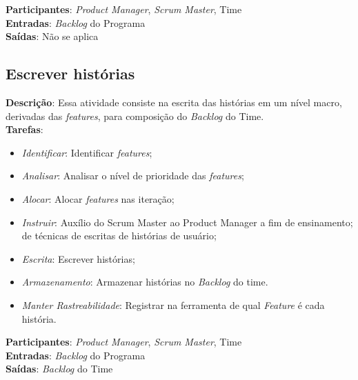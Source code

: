   \textbf{Participantes}: \textit{Product Manager}, \textit{Scrum Master}, Time\\

  \textbf{Entradas}: \textit{Backlog} do Programa \\

  \textbf{Saídas}:  Não se aplica\\

\subsection{Escrever histórias}
  \textbf{Descrição}: Essa atividade consiste na escrita das histórias em um nível macro, derivadas das \textit{features}, para composição do \textit{Backlog} do Time. \\

  \textbf{Tarefas}:
  \begin{itemize}
   \item \indent \textit{Identificar}: Identificar \textit{features};

   \item \indent \textit{Analisar}: Analisar o nível de prioridade das \textit{features};

   \item \indent \textit{Alocar}: Alocar \textit{features} nas iteração;

   \item \indent \textit{Instruir}: Auxílio do Scrum Master ao Product Manager a fim de ensinamento; de técnicas de escritas de histórias de usuário;

   \item \indent \textit{Escrita}: Escrever histórias;

   \item \indent \textit{Armazenamento}: Armazenar histórias no \textit{Backlog} do time.
   
   \item \indent \textit{Manter Rastreabilidade}: Registrar na ferramenta de qual \textit{Feature} é cada história.

  \end{itemize}

  \textbf{Participantes}: \textit{Product Manager}, \textit{Scrum Master}, Time\\

  \textbf{Entradas}: \textit{Backlog} do Programa \\

  \textbf{Saídas}:   \textit{Backlog} do Time \\

